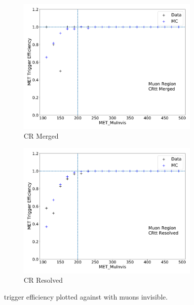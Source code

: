 \begin{figure}[tb]
  \centering
     \begin{subfigure}{0.49\textwidth}
     \includegraphics[width = 0.98\textwidth]{Figures/4/trig/trig_invis/CRtt Merged/MetTST_met.pdf}
     \caption{\ttbar CR Merged}
     \end{subfigure}
     \begin{subfigure}{0.49\textwidth}
     \includegraphics[width = 0.98\textwidth]{Figures/4/trig/trig_invis/CRtt Resolved/MetTST_met.pdf}
     \caption{\ttbar CR Resolved}
     \end{subfigure}
  \caption{\met trigger efficiency plotted against \met with muons invisible.}
  \label{fig:trig_invis}
\end{figure}

